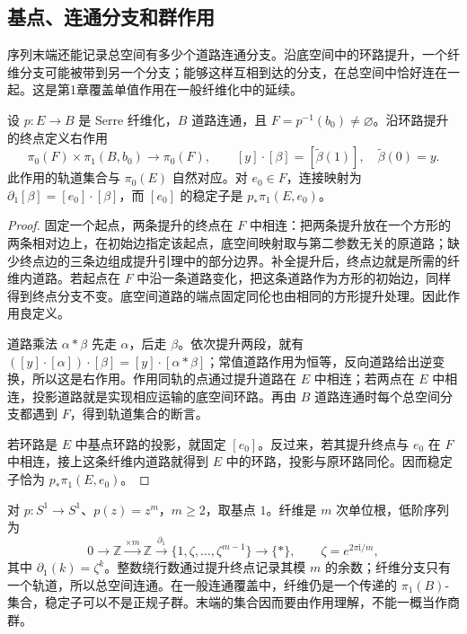 \subsection{基点、连通分支和群作用}
\label{g2:subsec:0803:03}

序列末端还能记录总空间有多少个道路连通分支。沿底空间中的环路提升，一个纤维分支可能被带到另一个分支；能够这样互相到达的分支，在总空间中恰好连在一起。这是第1章覆盖单值作用在一般纤维化中的延续。

\begin{proposition}
	\label{g2:prop:fibration-component-action}
	设 \(p:E\to B\) 是 Serre 纤维化，\(B\) 道路连通，且 \(F=p^{-1}(b_0)\ne\varnothing\)。沿环路提升的终点定义右作用
	\[
		\pi_0(F)\times\pi_1(B,b_0)\longrightarrow\pi_0(F),\qquad
		[y]\cdot[\beta]=[\widetilde\beta(1)],\quad\widetilde\beta(0)=y.
	\]
	此作用的轨道集合与 \(\pi_0(E)\) 自然对应。对 \(e_0\in F\)，连接映射为 \(\partial_1[\beta]=[e_0]\cdot[\beta]\)，而 \([e_0]\) 的稳定子是 \(p_*\pi_1(E,e_0)\)。
\end{proposition}

\begin{proof}
	固定一个起点，两条提升的终点在 \(F\) 中相连：把两条提升放在一个方形的两条相对边上，在初始边指定该起点，底空间映射取与第二参数无关的原道路；缺少终点边的三条边组成提升引理中的部分边界。补全提升后，终点边就是所需的纤维内道路。若起点在 \(F\) 中沿一条道路变化，把这条道路作为方形的初始边，同样得到终点分支不变。底空间道路的端点固定同伦也由相同的方形提升处理。因此作用良定义。

	道路乘法 \(\alpha*\beta\) 先走 \(\alpha\)，后走 \(\beta\)。依次提升两段，就有 \(([y]\cdot[\alpha])\cdot[\beta]=[y]\cdot[\alpha*\beta]\)；常值道路作用为恒等，反向道路给出逆变换，所以这是右作用。作用同轨的点通过提升道路在 \(E\) 中相连；若两点在 \(E\) 中相连，投影道路就是实现相应运输的底空间环路。再由 \(B\) 道路连通时每个总空间分支都遇到 \(F\)，得到轨道集合的断言。

	若环路是 \(E\) 中基点环路的投影，就固定 \([e_0]\)。反过来，若其提升终点与 \(e_0\) 在 \(F\) 中相连，接上这条纤维内道路就得到 \(E\) 中的环路，投影与原环路同伦。因而稳定子恰为 \(p_*\pi_1(E,e_0)\)。
\end{proof}

\begin{example}
	\label{g2:exm:covering-sequence-tail}
	对 \(p:S^1\to S^1\)、\(p(z)=z^m\)，\(m\ge2\)，取基点 \(1\)。纤维是 \(m\) 次单位根，低阶序列为
	\[
		0\longrightarrow\mathbb Z\xrightarrow{\times m}\mathbb Z
		\xrightarrow{\partial_1}\{1,\zeta,\ldots,\zeta^{m-1}\}\longrightarrow\{*\},
		\qquad\zeta=e^{2\pi\mathrm i/m},
	\]
	其中 \(\partial_1(k)=\zeta^k\)。整数绕行数通过提升终点记录其模 \(m\) 的余数；纤维分支只有一个轨道，所以总空间连通。在一般连通覆盖中，纤维仍是一个传递的 \(\pi_1(B)\)-集合，稳定子可以不是正规子群。末端的集合因而要由作用理解，不能一概当作商群。
\end{example}

